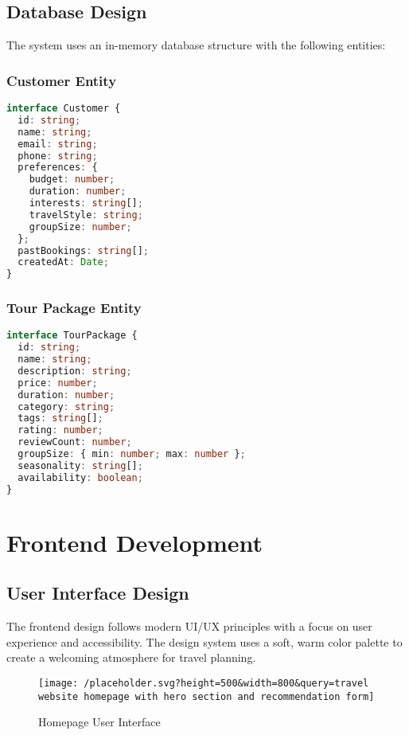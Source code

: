 \documentclass[12pt,a4paper]{article}
\begin{document}
\subsection{Database Design}
The system uses an in-memory database structure with the following entities:

\subsubsection{Customer Entity}
\begin{lstlisting}[language=typescript, caption=Customer Data Structure]
interface Customer {
  id: string;
  name: string;
  email: string;
  phone: string;
  preferences: {
    budget: number;
    duration: number;
    interests: string[];
    travelStyle: string;
    groupSize: number;
  };
  pastBookings: string[];
  createdAt: Date;
}
\end{lstlisting}

\subsubsection{Tour Package Entity}
\begin{lstlisting}[language=typescript, caption=Tour Package Data Structure]
interface TourPackage {
  id: string;
  name: string;
  description: string;
  price: number;
  duration: number;
  category: string;
  tags: string[];
  rating: number;
  reviewCount: number;
  groupSize: { min: number; max: number };
  seasonality: string[];
  availability: boolean;
}
\end{lstlisting}

\newpage

\section{Frontend Development}

\subsection{User Interface Design}
The frontend design follows modern UI/UX principles with a focus on user experience and accessibility. The design system uses a soft, warm color palette to create a welcoming atmosphere for travel planning.

\begin{figure}[H]
    \centering
    \texttt{[image: /placeholder.svg?height=500\&width=800\&query=travel website homepage with hero section and recommendation form]}
    \caption{Homepage User Interface}
    \label{fig:homepage}
\end{figure}
\end{document}

